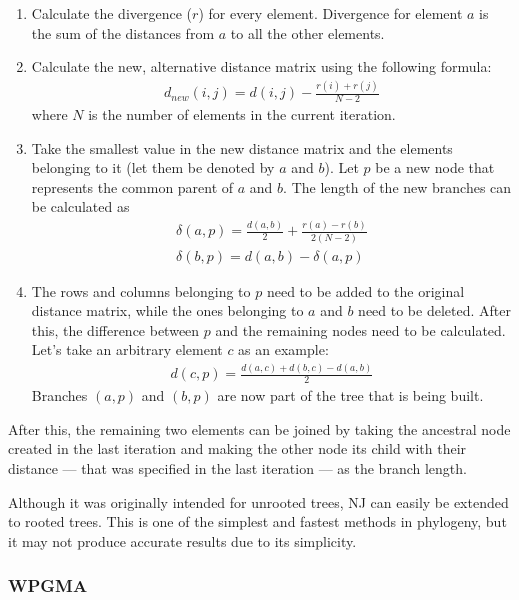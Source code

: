 \documentclass[11pt,twocolumn]{article}
\begin{document}
\begin{enumerate}
\item Calculate the divergence ($r$) for every element. Divergence for element $a$ is the sum of the distances from $a$ to all the other elements.

\item Calculate the new, alternative distance matrix using the following formula:
\begin{align}
d_{new}(i, j) = d(i, j) - \frac{r(i) + r(j)}{N - 2}
\end{align}
where $N$ is the number of elements in the current iteration.

\item Take the smallest value in the new distance matrix and the elements belonging to it (let them be denoted by $a$ and $b$). Let $p$ be a new node that represents the common parent of $a$ and $b$. The length of the new branches can be calculated as
\begin{align}
\delta(a, p) = \frac{d(a, b)}{2} + \frac{r(a) - r(b)}{2 (N - 2)} \\
\delta(b, p) = d(a, b) - \delta(a, p)
\end{align}

\item The rows and columns belonging to $p$ need to be added to the original distance matrix, while the ones belonging to $a$ and $b$ need to be deleted. After this, the difference between $p$ and the remaining nodes need to be calculated. Let's take an arbitrary element $c$ as an example:
\begin{align}
d(c, p) = \frac{d(a, c) + d(b, c) - d(a, b)}{2}
\end{align}
Branches $(a, p)$ and $(b, p)$ are now part of the tree that is being built.

\end{enumerate}

After this, the remaining two elements can be joined by taking the ancestral node created in the last iteration and making the other node its child with their distance — that was specified in the last iteration — as the branch length.

Although it was originally intended for unrooted trees, NJ can easily be extended to rooted trees. This is one of the simplest and fastest methods in phylogeny, but it may not produce accurate results due to its simplicity.

\subsubsection{WPGMA}
\end{document}
